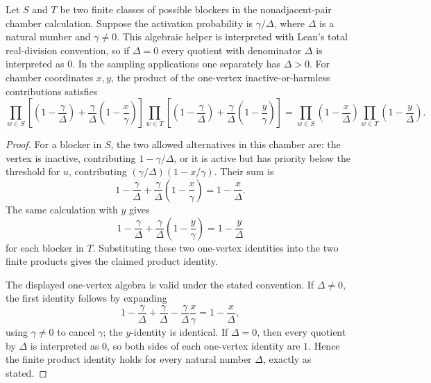 \begin{helper}
Let \(S\) and \(T\) be two finite classes of possible blockers in the
nonadjacent-pair chamber calculation.  Suppose the activation probability is
\(\gamma/\Delta\), where \(\Delta\) is a natural number and \(\gamma\ne0\).
This algebraic helper is interpreted with Lean's total real-division
convention, so if \(\Delta=0\) every quotient with denominator \(\Delta\) is
interpreted as \(0\).  In the sampling applications one separately has
\(\Delta>0\).  For chamber coordinates \(x,y\), the product of the one-vertex
inactive-or-harmless contributions satisfies
\[
\prod_{w\in S}\left[
\left(1-\frac{\gamma}{\Delta}\right)
+\frac{\gamma}{\Delta}\left(1-\frac{x}{\gamma}\right)\right]
\prod_{w\in T}\left[
\left(1-\frac{\gamma}{\Delta}\right)
+\frac{\gamma}{\Delta}\left(1-\frac{y}{\gamma}\right)\right]
=
\prod_{w\in S}\left(1-\frac{x}{\Delta}\right)
\prod_{w\in T}\left(1-\frac{y}{\Delta}\right).
\]
\end{helper}
\begin{proof}
For a blocker in \(S\), the two allowed alternatives in this chamber are:
the vertex is inactive, contributing \(1-\gamma/\Delta\), or it is active but
has priority below the threshold for \(u\), contributing
\((\gamma/\Delta)(1-x/\gamma)\).  Their sum is
\[
1-\frac{\gamma}{\Delta}
+\frac{\gamma}{\Delta}\left(1-\frac{x}{\gamma}\right)
=1-\frac{x}{\Delta}.
\]
The same calculation with \(y\) gives
\[
1-\frac{\gamma}{\Delta}
+\frac{\gamma}{\Delta}\left(1-\frac{y}{\gamma}\right)
=1-\frac{y}{\Delta}
\]
for each blocker in \(T\).  Substituting these two one-vertex identities into
the two finite products gives the claimed product identity.

The displayed one-vertex algebra is valid under the stated convention.  If
\(\Delta\ne0\), the first identity follows by expanding
\[
1-\frac{\gamma}{\Delta}
+\frac{\gamma}{\Delta}-\frac{\gamma}{\Delta}\frac{x}{\gamma}
=1-\frac{x}{\Delta},
\]
using \(\gamma\ne0\) to cancel \(\gamma\); the \(y\)-identity is identical.
If \(\Delta=0\), then every quotient by \(\Delta\) is interpreted as \(0\), so
both sides of each one-vertex identity are \(1\).  Hence the finite product
identity holds for every natural number \(\Delta\), exactly as stated.
\end{proof}
